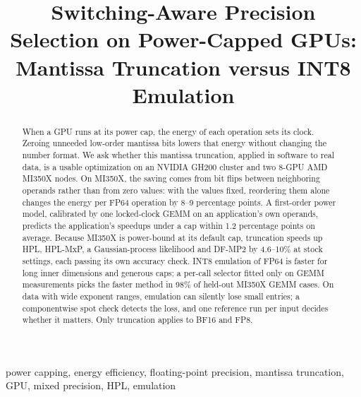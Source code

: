 \documentclass[conference]{IEEEtran}
\newcommand{\pct}{\%}
\begin{document}

\title{Switching-Aware Precision Selection on Power-Capped GPUs: Mantissa Truncation versus INT8 Emulation}

\newif\ifblind \blindfalse
\ifblind
\author{\IEEEauthorblockN{Anonymous Author(s)}}
\else
\author{
}
\fi

\maketitle

\begin{abstract}
When a GPU runs at its power cap, the energy of each operation sets its clock. Zeroing unneeded low-order mantissa bits
lowers that energy without changing the number format. We ask whether this mantissa truncation, applied in software to
real data, is a usable optimization on an NVIDIA GH200 cluster and two 8-GPU AMD MI350X nodes. On MI350X, the saving comes
from bit flips between neighboring operands rather than from zero values: with the values fixed, reordering them alone
changes the energy per FP64 operation by 8--9 percentage points. A first-order power model, calibrated by one
locked-clock GEMM on an application's own operands, predicts the application's speedups under a cap within 1.2
percentage points on average. Because MI350X is power-bound at its default cap, truncation speeds up HPL, HPL-MxP, a
Gaussian-process likelihood and DF-MP2 by 4.6--10\pct{} at stock settings, each passing its own accuracy check.
INT8 emulation of FP64 is faster for long inner dimensions and generous caps; a per-call selector fitted only on GEMM
measurements picks the faster method in 98\pct{} of held-out MI350X GEMM cases. On data with wide exponent ranges,
emulation can silently lose small entries; a componentwise spot check detects the loss, and one reference run per input
decides whether it matters. Only truncation applies to BF16 and FP8.
\end{abstract}

\begin{IEEEkeywords}
power capping, energy efficiency, floating-point precision, mantissa truncation, GPU, mixed precision, HPL, emulation
\end{IEEEkeywords}

\end{document}
